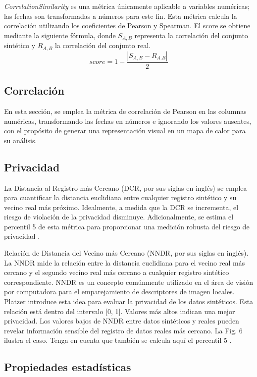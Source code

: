 \emph{CorrelationSimilarity} es una métrica únicamente aplicable a variables numéricas; las fechas son transformadas a números para este fin. Esta métrica calcula la correlación utilizando los coeficientes de Pearson y Spearman. El score se obtiene mediante la siguiente fórmula, donde $S_{A,B}$ representa la correlación del conjunto sintético y $R_{A,B}$ la correlación del conjunto real.
\[
score = 1 - \frac{|S_{A,B} - R_{A.B}|}{2}
\]


\subsection{Correlación}
En esta sección, se emplea la métrica de correlación de Pearson en las columnas numéricas, transformando las fechas en números e ignorando los valores ausentes, con el propósito de generar una representación visual en un mapa de calor para su análisis.


\subsection{Privacidad}
La Distancia al Registro más Cercano (DCR, por sus siglas en inglés) se emplea para cuantificar la distancia euclidiana entre cualquier registro sintético y su vecino real más próximo. Idealmente, a medida que la DCR se incrementa, el riesgo de violación de la privacidad disminuye. Adicionalmente, se estima el percentil 5 de esta métrica para proporcionar una medición robusta del riesgo de privacidad \cite{zhao_ctab-gan_2021}.

Relación de Distancia del Vecino más Cercano (NNDR, por sus siglas en inglés). La NNDR mide la relación entre la distancia euclidiana para el vecino real más cercano y el segundo vecino real más cercano a cualquier registro sintético correspondiente. NNDR es un concepto comúnmente utilizado en el área de visión por computadora para el emparejamiento de descriptores de imagen locales. Platzer \cite{noauthor_virtual_2022} introduce esta idea para evaluar la privacidad de los datos sintéticos. Esta relación está dentro del intervalo [0, 1]. Valores más altos indican una mejor privacidad. Los valores bajos de NNDR entre datos sintéticos y reales pueden revelar información sensible del registro de datos reales más cercano. La Fig. 6 ilustra el caso. Tenga en cuenta que también se calcula aquí el percentil 5 \cite{zhao_ctab-gan_2021}.


\subsection{Propiedades estadísticas}

